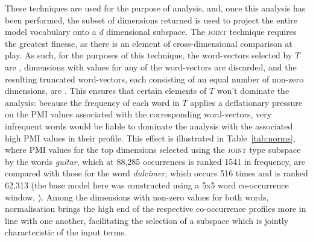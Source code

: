 
These techniques are used for the purpose of analysis, and, once this analysis has been performed, the subset of dimensions returned is used to project the entire model vocabulary onto a $d$ dimensional subspace.  The \textsc{joint} technique requires the greatest finesse, as there is an element of cross-dimensional comparison at play.  As such, for the purposes of this technique, the word-vectors selected by $T$ are  , dimensions with  values for any of the word-vectors are discarded, and the resulting truncated word-vectors, each consisting of an equal number of non-zero dimensions, are  .  This ensures that certain elements of $T$ won't dominate the analysis: because the frequency of each word in $T$ applies a deflationary pressure on the PMI values associated with the corresponding word-vectors, very infrequent words would be liable to dominate the analysis with the associated high PMI values in their profile.  This effect is illustrated in Table~\ref{tab:norms}, where PMI values for the top dimensions selected using the \textsc{joint} type subspace by the words \emph{guitar}, which at 88,285 occurrences is ranked 1541 in frequency, are compared with those for the word \emph{dulcimer}, which occurs 516 times and is ranked 62,313 (the base model here was constructed using a 5x5 word co-occurrence window, ).  Among the dimensions with non-zero values for both words, normalisation brings the high end of the respective co-occurrence profiles more in line with one another, facilitating the selection of a subspace which is jointly characteristic of the input terms.


